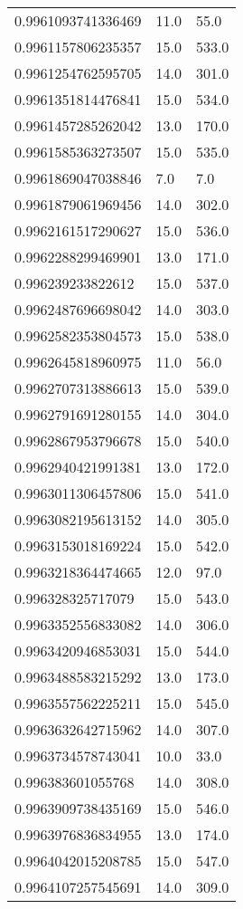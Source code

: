 \begin{center}
\begin{supertabular}[H]{p{0.30\textwidth}p{0.05\textwidth}p{0.05\textwidth}}
0.9961093741336469 & 11.0 & 55.0 \\ 
0.9961157806235357 & 15.0 & 533.0 \\ 
0.9961254762595705 & 14.0 & 301.0 \\ 
0.9961351814476841 & 15.0 & 534.0 \\ 
0.9961457285262042 & 13.0 & 170.0 \\ 
0.9961585363273507 & 15.0 & 535.0 \\ 
0.9961869047038846 & 7.0 & 7.0 \\ 
0.9961879061969456 & 14.0 & 302.0 \\ 
0.9962161517290627 & 15.0 & 536.0 \\ 
0.9962288299469901 & 13.0 & 171.0 \\ 
0.996239233822612 & 15.0 & 537.0 \\ 
0.9962487696698042 & 14.0 & 303.0 \\ 
0.9962582353804573 & 15.0 & 538.0 \\ 
0.9962645818960975 & 11.0 & 56.0 \\ 
0.9962707313886613 & 15.0 & 539.0 \\ 
0.9962791691280155 & 14.0 & 304.0 \\ 
0.9962867953796678 & 15.0 & 540.0 \\ 
0.9962940421991381 & 13.0 & 172.0 \\ 
0.9963011306457806 & 15.0 & 541.0 \\ 
0.9963082195613152 & 14.0 & 305.0 \\ 
0.9963153018169224 & 15.0 & 542.0 \\ 
0.9963218364474665 & 12.0 & 97.0 \\ 
0.996328325717079 & 15.0 & 543.0 \\ 
0.9963352556833082 & 14.0 & 306.0 \\ 
0.9963420946853031 & 15.0 & 544.0 \\ 
0.9963488583215292 & 13.0 & 173.0 \\ 
0.9963557562225211 & 15.0 & 545.0 \\ 
0.9963632642715962 & 14.0 & 307.0 \\ 
0.9963734578743041 & 10.0 & 33.0 \\ 
0.996383601055768 & 14.0 & 308.0 \\ 
0.9963909738435169 & 15.0 & 546.0 \\ 
0.9963976836834955 & 13.0 & 174.0 \\ 
0.9964042015208785 & 15.0 & 547.0 \\ 
0.9964107257545691 & 14.0 & 309.0 \\ 

\end{supertabular}
\end{center}
